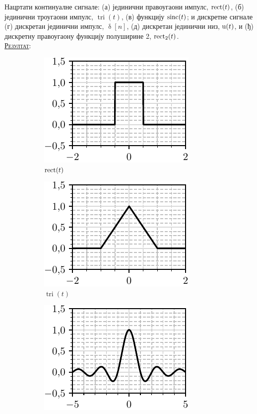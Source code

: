 \PID Нацртати континуалне сигнале:
(а) јединични правоугаони импулс, $\operatorname{rect}(t)$, 
(б) јединични троугаони импулс, $\operatorname{tri}(t)$, 
(в) функцију $\operatorname{sinc}(t)$; и дискретне сигнале 
(г) дискретан јединични импулс, $\updelta[n]$, 
(д) дискретан јединични низ, ${\rm u}(t)$, и 
(ђ) дискретну правоугаону функцију полуширине 2, $\operatorname{rect}_2(t)$.
\\[2mm]

\textsc{\underline{Резултат}}:
\begin{figure}[ht!]
    \hspace*{0pt}\hfill
    \begin{subfigure}[c]{0.33\textwidth}
        \centering
        \includegraphics[scale=1]{fig/rect_plot.pdf}
        \caption{$\operatorname{rect}(t)$}
    \end{subfigure}
    \hspace*{0pt}\hfill
    \begin{subfigure}[c]{0.3\textwidth}
        \centering
        \includegraphics[scale=1]{fig/tri_plot.pdf}
        \caption{$\operatorname{tri}(t)$}
    \end{subfigure}
    \hfill
    \hspace*{0pt}
    \hspace*{0pt}\hfill
    \begin{subfigure}[c]{0.3\textwidth}
        \centering
        \includegraphics[scale=1]{fig/sinc_plot.pdf}

\end{subfigure}
\end{figure}
